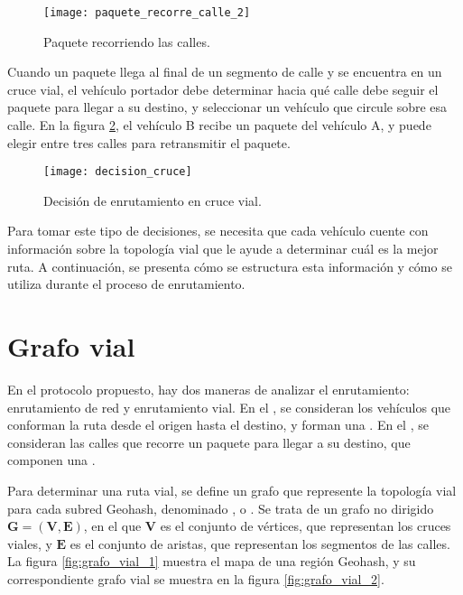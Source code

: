 \begin{figure}[th]
\centering
\texttt{[image: paquete\_recorre\_calle\_2]}
\decoRule
\caption[Paquete recorriendo las calles]{Paquete recorriendo las calles.}
\label{fig:paquete_recorre_calle_2}
\end{figure}

Cuando un paquete llega al final de un segmento de calle y se encuentra en un
cruce vial, el vehículo portador debe determinar hacia qué calle debe seguir el
paquete para llegar a su destino, y seleccionar un vehículo que circule sobre
esa calle. En la figura \ref{fig:decision_cruce}, el vehículo B recibe un
paquete del vehículo A, y puede elegir entre tres calles para retransmitir el
paquete.

\begin{figure}[th!]
\centering
\texttt{[image: decision\_cruce]}
\decoRule
\caption[Decisión de enrutamiento en cruce vial]{Decisión de enrutamiento en
cruce vial.}
\label{fig:decision_cruce}
\end{figure}

Para tomar este tipo de decisiones, se necesita que cada vehículo cuente con
información sobre la topología vial que le ayude a determinar cuál es la mejor
ruta. A continuación, se presenta cómo se estructura esta información y cómo se
utiliza durante el proceso de enrutamiento.

\section{Grafo vial}

\label{sec:grafo_vial}

En el protocolo propuesto, hay dos maneras de analizar el enrutamiento:
enrutamiento de red y enrutamiento vial. En el ,
se consideran los vehículos que conforman la ruta desde el origen hasta el
destino, y forman una . En el ,
se consideran las calles que recorre un paquete para llegar a su destino, que
componen una .

Para determinar una ruta vial, se define un grafo que represente la topología
vial para cada subred Geohash, denominado , o . Se trata de un grafo no dirigido $\mathbf{G}=(\mathbf{V},\mathbf{E})$,
en el que $\mathbf{V}$ es el conjunto de vértices, que representan los cruces
viales, y $\mathbf{E}$ es el conjunto de aristas, que representan los segmentos
de las calles. La figura \ref{fig:grafo_vial_1} muestra el mapa de una región
Geohash, y su correspondiente grafo vial se muestra en la figura
\ref{fig:grafo_vial_2}.

